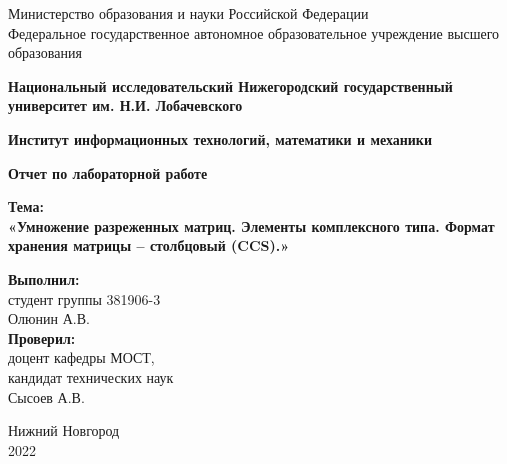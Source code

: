 \documentclass[12pt]{report}
\begin{document}
\begin{titlepage}
\begin{center}
    Министерство образования и науки Российской Федерации \\
    Федеральное государственное автономное образовательное учреждение высшего образования
\end{center}
\begin{center}
    \textbf{Национальный исследовательский Нижегородский государственный университет им. Н.И. Лобачевского} \\
\end{center}
\begin{center}
    \textbf{Институт информационных технологий, математики и механики}\\
\end{center}

\vspace{4em}

\begin{center}
    \textbf{\Large Отчет по лабораторной работе} \\
\end{center}

\begin{center}
    \textbf{\Large Тема:} \\
    \textbf{\Large «Умножение разреженных матриц. Элементы комплексного типа. Формат хранения матрицы – столбцовый (CCS).»}
\end{center}

\vspace{4em}

\begin{flushright}
\begin{minipage}{0.55\textwidth}
\begin{flushleft}

\textbf{Выполнил:} \\
студент группы 381906-3 \\
Олюнин А.В. \\

\textbf{Проверил:} \\
доцент кафедры МОСТ, \\
кандидат технических наук \\
Сысоев А.В. \\
\end{flushleft}
\end{minipage}
\end{flushright}


\vspace{\fill}

\begin{center}
Нижний Новгород \\
2022
\end{center}

\end{titlepage}
\end{document}
